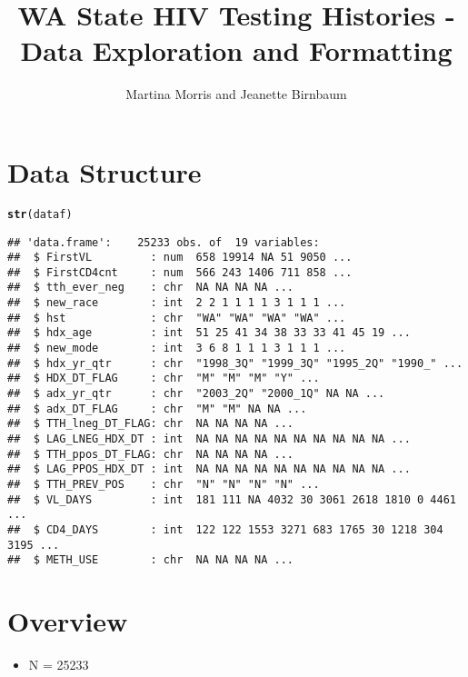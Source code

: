 \documentclass{article}\usepackage[]{graphicx}\usepackage[]{color}
\makeatletter
\newcommand{\hlstd}[1]{\textcolor[rgb]{0.345,0.345,0.345}{#1}}%
\newcommand{\hlkwd}[1]{\textcolor[rgb]{0.737,0.353,0.396}{\textbf{#1}}}%
\newenvironment{kframe}{%
 \def\at@end@of@kframe{}%
 \ifinner\ifhmode%
  \def\at@end@of@kframe{\end{minipage}}%
  \begin{minipage}{\columnwidth}%
 \fi\fi%
 \def\FrameCommand##1{\hskip\@totalleftmargin \hskip-\fboxsep
 \colorbox{shadecolor}{##1}\hskip-\fboxsep
     \hskip-\linewidth \hskip-\@totalleftmargin \hskip\columnwidth}%
 \MakeFramed {\advance\hsize-\width
   \@totalleftmargin\z@ \linewidth\hsize
   \@setminipage}}%
 {\par\unskip\endMakeFramed%
 \at@end@of@kframe}
\newenvironment{knitrout}{}{} %
\makeatother
\begin{document}
\title{WA State HIV Testing Histories - Data Exploration and Formatting}
\author{Martina Morris and Jeanette Birnbaum}
\maketitle

\section{Data Structure}



\begin{knitrout}
\color{fgcolor}\begin{kframe}
\begin{alltt}
\hlkwd{str}\hlstd{(dataf)}
\end{alltt}
\begin{verbatim}
## 'data.frame':	25233 obs. of  19 variables:
##  $ FirstVL         : num  658 19914 NA 51 9050 ...
##  $ FirstCD4cnt     : num  566 243 1406 711 858 ...
##  $ tth_ever_neg    : chr  NA NA NA NA ...
##  $ new_race        : int  2 2 1 1 1 1 3 1 1 1 ...
##  $ hst             : chr  "WA" "WA" "WA" "WA" ...
##  $ hdx_age         : int  51 25 41 34 38 33 33 41 45 19 ...
##  $ new_mode        : int  3 6 8 1 1 1 3 1 1 1 ...
##  $ hdx_yr_qtr      : chr  "1998_3Q" "1999_3Q" "1995_2Q" "1990_" ...
##  $ HDX_DT_FLAG     : chr  "M" "M" "M" "Y" ...
##  $ adx_yr_qtr      : chr  "2003_2Q" "2000_1Q" NA NA ...
##  $ adx_DT_FLAG     : chr  "M" "M" NA NA ...
##  $ TTH_lneg_DT_FLAG: chr  NA NA NA NA ...
##  $ LAG_LNEG_HDX_DT : int  NA NA NA NA NA NA NA NA NA NA ...
##  $ TTH_ppos_DT_FLAG: chr  NA NA NA NA ...
##  $ LAG_PPOS_HDX_DT : int  NA NA NA NA NA NA NA NA NA NA ...
##  $ TTH_PREV_POS    : chr  "N" "N" "N" "N" ...
##  $ VL_DAYS         : int  181 111 NA 4032 30 3061 2618 1810 0 4461 ...
##  $ CD4_DAYS        : int  122 122 1553 3271 683 1765 30 1218 304 3195 ...
##  $ METH_USE        : chr  NA NA NA NA ...
\end{verbatim}
\end{kframe}
\end{knitrout}


\section{Overview}




\begin{itemize}
    \item N = 25233
\end{itemize}
\end{document}
